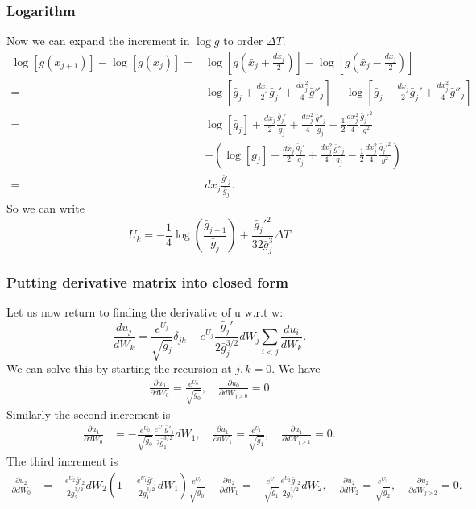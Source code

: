\subsubsection{Logarithm}
Now we can expand the increment in $\log g$ to order $\Delta T$.
\begin{align}
\log[g(x_{j+1})] -\log[g(x_{j})] =& \log[g\left(\bar{x}_j+ \frac{dx_j}{2}\right)] -\log[g\left(\bar{x}_j- \frac{dx_j}{2}\right)]\\
=& \log\left[\bar{g}_j+ \frac{dx_j}{2}\bar{g}_j' + \frac{dx_j^2}{4}\bar{g}''_j\right]-\log\left[\bar{g}_j- \frac{dx_j}{2}\bar{g}_j' + \frac{dx_j^2}{4}\bar{g}''_j\right]\\
=& \log\left[\bar{g}_j\right] + \frac{dx_j}{2}\frac{\bar{g}_j'}{g_j} + \frac{dx_j^2}{4}\frac{\bar{g}''_j}{g_j} - \frac{1}{2}\frac{dx_j^2}{4}\frac{\bar{g}_j'^2}{g^2}\nonumber\\
&-\left(\log\left[\bar{g}_j\right] - \frac{dx_j}{2}\frac{\bar{g}_j'}{g_j} + \frac{dx_j^2}{4}\frac{\bar{g}''_j}{g_j} - \frac{1}{2}\frac{dx_j^2}{4}\frac{\bar{g}_j'^2}{g^2}\right)\\
=& dx_j\frac{\bar{g}'_j}{\bar{g}_j}.\label{eq:log_strat}
\end{align}
So we can write 
\begin{equation}
\boxed{U_k=-\frac{1}{4}\log\left(\frac{\bar{g}_{j+1}}{\bar{g}_j}\right)+ \frac{\bar{g}_j'^2}{32 \bar{g}_j^3}\Delta T}
\end{equation}

\subsubsection{Putting derivative matrix into closed form}

Let us now return to finding the derivative of u w.r.t w:
\begin{equation}
\boxed{\frac{du_j}{dW_k} = \frac{e^{U_j}}{\sqrt{\bar{g}_j}}\delta_{jk} -e^{U_j}\frac{\bar{g}_j'}{2\bar{g}^{3/2}_j}dW_j\sum_{i<j}\frac{d u_i}{dW_k}.}
\end{equation}
We can solve this by starting the recursion at $j,k=0$.  We have 
\begin{gather}
\frac{\partial u_0}{\partial dW_0} = \frac{e^{U_0}}{\sqrt{\bar{g}_0}}, \quad \frac{\partial u_0}{\partial dW_{j>0}} = 0
\end{gather}
Similarly the second increment is 
\begin{align}
\frac{\partial u_1}{\partial dW_0}& = -\frac{e^{U_0}}{\sqrt{\bar{g}_0}}\frac{e^{U_1}\bar{g}'_1}{2\bar{g}_1^{3/2}}dW_1, \quad \frac{\partial u_1}{\partial dW_1} = \frac{e^{U_1}}{\sqrt{\bar{g}_1}} ,\quad \frac{\partial u_1}{\partial dW_{j>1}} = 0.
\end{align}
The third increment is 
\begin{align}
\frac{\partial u_2}{\partial dW_0}& = -\frac{e^{U_2}\bar{g}'_2}{2\bar{g}_2^{3/2}}dW_2\left(1-\frac{e^{U_1}\bar{g}'_1}{2\bar{g}_1^{3/2}}dW_1\right)\frac{e^{U_0}}{\sqrt{\bar{g}_0}}\, \quad \frac{\partial u_2}{\partial dW_1} = -\frac{e^{U_1}}{\sqrt{\bar{g}_1}}\frac{e^{U_2}\bar{g}'_2}{2\bar{g}_2^{3/2}}dW_2, \quad \frac{\partial u_2}{\partial dW_2} = \frac{e^{U_2}}{\sqrt{\bar{g}_2}}, \quad \frac{\partial u_2}{\partial dW_{j>2}} = 0.
\end{align}


